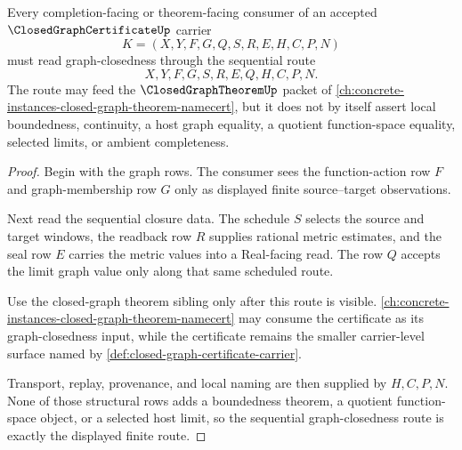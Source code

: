 \begin{theorem}
\label{thm:closed-graph-certificate-sequential-route}
Every completion-facing or theorem-facing consumer of an accepted $\ClosedGraphCertificateUp$ carrier
$$
K=(X,Y,F,G,Q,S,R,E,H,C,P,N)
$$
must read graph-closedness through the sequential route
$$
X,Y,F,G,S,R,E,Q,H,C,P,N .
$$
The route may feed the $\ClosedGraphTheoremUp$ packet of \autoref{ch:concrete-instances-closed-graph-theorem-namecert}, but it does not by itself assert local boundedness, continuity, a host graph equality, a quotient function-space equality, selected limits, or ambient completeness.
\end{theorem}
\begin{proof}
Begin with the graph rows. The consumer sees the function-action row $F$ and graph-membership row $G$ only as displayed finite source--target observations.

Next read the sequential closure data. The schedule $S$ selects the source and target windows, the readback row $R$ supplies rational metric estimates, and the seal row $E$ carries the metric values into a Real-facing read. The row $Q$ accepts the limit graph value only along that same scheduled route.

Use the closed-graph theorem sibling only after this route is visible. \autoref{ch:concrete-instances-closed-graph-theorem-namecert} may consume the certificate as its graph-closedness input, while the certificate remains the smaller carrier-level surface named by \autoref{def:closed-graph-certificate-carrier}.

Transport, replay, provenance, and local naming are then supplied by $H,C,P,N$. None of those structural rows adds a boundedness theorem, a quotient function-space object, or a selected host limit, so the sequential graph-closedness route is exactly the displayed finite route.
\end{proof}

\begin{closurestatus}{\ClosedGraphCertificateUp}
  \theoryclosure{\seedClosure}
  \formalstatus{\unformalizedV}
\end{closurestatus}
